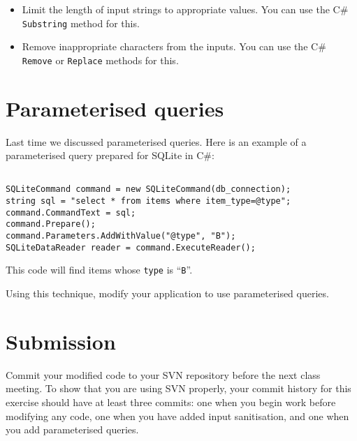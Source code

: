 \documentclass{article}
\begin{document}
\begin{itemize}
	\item Limit the length of input strings to appropriate values.  You 
		can use the C\# \texttt{Substring} method for this.
	\item Remove inappropriate characters from the inputs.  You can
		use the C\# \texttt{Remove} or \texttt{Replace} methods
		for this.
\end{itemize}

\newpage

\section{Parameterised queries}
Last time we discussed parameterised queries.  Here is an example of
a parameterised query prepared for SQLite in C\#:

\begin{verbatim}

SQLiteCommand command = new SQLiteCommand(db_connection);
string sql = "select * from items where item_type=@type";
command.CommandText = sql;
command.Prepare();
command.Parameters.AddWithValue("@type", "B");
SQLiteDataReader reader = command.ExecuteReader();
\end{verbatim}

This code will find items whose \texttt{type} is ``\texttt{B}''.

Using this technique, modify your application to use parameterised queries.

\section{Submission}
Commit your modified code to your SVN repository before the next class meeting.  To show
that you are using SVN properly, your commit history for this exercise should have at least 
three commits: one when you begin work before modifying any code, one when you have added input
sanitisation, and one when you add parameterised queries.
\end{document}
